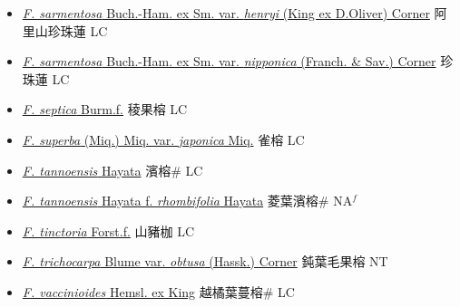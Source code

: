 \begin{itemize}
\begin{itemize}
        \item[] \href{http://www.theplantlist.org/tpl1.1/search?q=Ficus+sarmentosa+var.+henryi}{\textit{F. sarmentosa} Buch.-Ham. ex Sm. var. \textit{henryi} (King ex D.Oliver) Corner}   阿里山珍珠蓮 LC
        \item[] \href{http://www.theplantlist.org/tpl1.1/search?q=Ficus+sarmentosa+var.+nipponica}{\textit{F. sarmentosa} Buch.-Ham. ex Sm. var. \textit{nipponica} (Franch. \& Sav.) Corner}   珍珠蓮 LC
        \item[] \href{http://www.theplantlist.org/tpl1.1/search?q=Ficus+septica}{\textit{F. septica} Burm.f.}   稜果榕 LC
        \item[] \href{http://www.theplantlist.org/tpl1.1/search?q=Ficus+superba+var.+japonica}{\textit{F. superba} (Miq.) Miq. var. \textit{japonica} Miq.}   雀榕 LC
        \item[] \href{http://www.theplantlist.org/tpl1.1/search?q=Ficus+tannoensis}{\textit{F. tannoensis} Hayata}   濱榕\# LC
        \item[] \href{http://www.theplantlist.org/tpl1.1/search?q=Ficus+tannoensis+ f. +rhombifolia}{\textit{F. tannoensis} Hayata  f.  \textit{rhombifolia} Hayata}   菱葉濱榕\# NA$^f$
        \item[] \href{http://www.theplantlist.org/tpl1.1/search?q=Ficus+tinctoria}{\textit{F. tinctoria} Forst.f.}   山豬枷 LC
        \item[] \href{http://www.theplantlist.org/tpl1.1/search?q=Ficus+trichocarpa+var.+obtusa}{\textit{F. trichocarpa} Blume var. \textit{obtusa} (Hassk.) Corner}   鈍葉毛果榕 NT
        \item[] \href{http://www.theplantlist.org/tpl1.1/search?q=Ficus+vaccinioides}{\textit{F. vaccinioides} Hemsl. ex King}   越橘葉蔓榕\# LC

\end{itemize}
\end{itemize}
